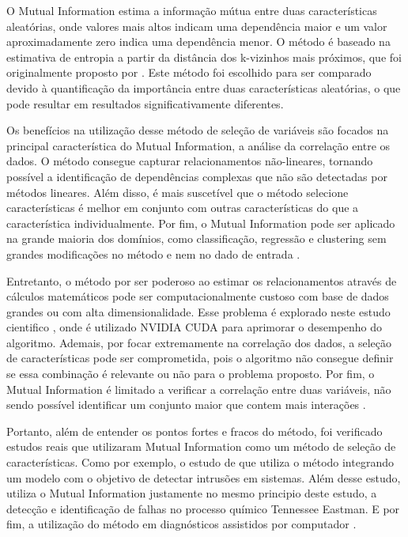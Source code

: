 O Mutual Information estima a informação mútua entre duas características aleatórias, onde valores mais altos indicam uma dependência maior e um valor aproximadamente zero indica uma dependência menor. O método é baseado na estimativa de entropia a partir da distância dos k-vizinhos mais próximos, que foi originalmente proposto por \cite{kraskov2011erratum}. Este método foi escolhido para ser comparado devido à quantificação da importância entre duas características aleatórias, o que pode resultar em resultados significativamente diferentes.

Os benefícios na utilização desse método de seleção de variáveis são focados na principal característica do Mutual Information, a análise da correlação entre os dados. O método consegue capturar relacionamentos não-lineares, tornando possível a identificação de dependências complexas que não são detectadas por métodos lineares. Além disso, é mais suscetível que o método selecione características é melhor em conjunto com outras características do que a característica individualmente. Por fim, o Mutual Information pode ser aplicado na grande maioria dos domínios, como classificação, regressão e clustering sem grandes modificações no método e nem no dado de entrada \cite{bao2008evaluation}.

Entretanto, o método por ser poderoso ao estimar os relacionamentos através de cálculos matemáticos pode ser computacionalmente custoso com base de dados grandes ou com alta dimensionalidade. Esse problema é explorado neste estudo cientifico \cite{shams2007speeding}, onde é utilizado NVIDIA CUDA para aprimorar o desempenho do algoritmo. Ademais, por focar extremamente na correlação dos dados, a seleção de características pode ser comprometida, pois o algoritmo não consegue definir se essa combinação é relevante ou não para o problema proposto. Por fim, o Mutual Information é limitado a verificar a correlação entre duas variáveis, não sendo possível identificar um conjunto maior que contem mais interações \cite{bao2008evaluation}.

Portanto, além de entender os pontos fortes e fracos do método, foi verificado estudos reais que utilizaram Mutual Information como um método de seleção de características. Como por exemplo, o estudo de \cite{amiri2011mutual} que utiliza o método integrando um modelo com o objetivo de detectar intrusões em sistemas. Além desse estudo, \cite{verron2008fault} utiliza o Mutual Information justamente no mesmo principio deste estudo, a detecção e identificação de falhas no processo químico Tennessee Eastman. E por fim, a utilização do método em diagnósticos assistidos por computador \cite{tourassi2001application}.


